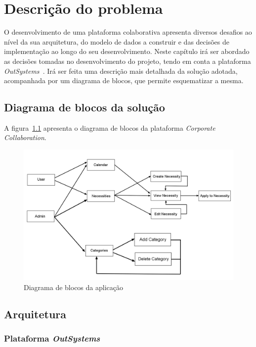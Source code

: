 \chapter{Descrição do problema}\label{chapter:description}

O desenvolvimento de uma plataforma colaborativa apresenta diversos desafios ao nível da sua arquitetura, 
do modelo de dados a construir e das decisões de implementação ao longo do seu desenvolvimento. 
Neste capítulo irá ser abordado as decisões tomadas no desenvolvimento do projeto, tendo em conta a plataforma \textit{OutSystems~\cite{outsystems}}. 
Irá ser feita uma descrição mais detalhada da solução adotada, acompanhada por um diagrama de blocos, que permite esquematizar a mesma.


\section{Diagrama de blocos da solução}\label{sec:diagram}
A figura~\ref{fig:diagram} apresenta o diagrama de blocos da plataforma \textit{Corporate Collaboration}. 

\begin{figure}[H]
  \centering
  \includegraphics[scale=0.4]{figures/Diagrama de blocos.png}
  \caption{Diagrama de blocos da aplicação}\label{fig:diagram}
\end{figure}

\newpage

\section{Arquitetura}\label{sec:arquitechture}

\subsection{Plataforma \textit{OutSystems}}\label{sec:OutSystemsArch}

